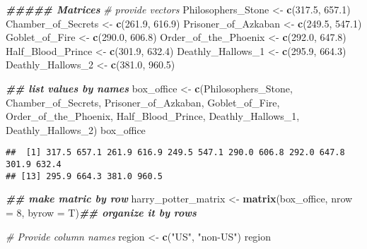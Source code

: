 \documentclass[
]{article}
\newenvironment{Shaded}{\begin{snugshade}}{\end{snugshade}}
\newcommand{\AttributeTok}[1]{\textcolor[rgb]{0.13,0.29,0.53}{#1}}
\newcommand{\CommentTok}[1]{\textcolor[rgb]{0.56,0.35,0.01}{\textit{#1}}}
\newcommand{\DecValTok}[1]{\textcolor[rgb]{0.00,0.00,0.81}{#1}}
\newcommand{\DocumentationTok}[1]{\textcolor[rgb]{0.56,0.35,0.01}{\textbf{\textit{#1}}}}
\newcommand{\FloatTok}[1]{\textcolor[rgb]{0.00,0.00,0.81}{#1}}
\newcommand{\FunctionTok}[1]{\textcolor[rgb]{0.13,0.29,0.53}{\textbf{#1}}}
\newcommand{\NormalTok}[1]{#1}
\newcommand{\OtherTok}[1]{\textcolor[rgb]{0.56,0.35,0.01}{#1}}
\newcommand{\StringTok}[1]{\textcolor[rgb]{0.31,0.60,0.02}{#1}}
\begin{document}
\begin{Shaded}
\begin{Highlighting}[]
\DocumentationTok{\#\#\#\#\# Matrices}
\CommentTok{\# provide vectors}
\NormalTok{Philosophers\_Stone }\OtherTok{\textless{}{-}} \FunctionTok{c}\NormalTok{(}\FloatTok{317.5}\NormalTok{, }\FloatTok{657.1}\NormalTok{)}
\NormalTok{Chamber\_of\_Secrets }\OtherTok{\textless{}{-}} \FunctionTok{c}\NormalTok{(}\FloatTok{261.9}\NormalTok{, }\FloatTok{616.9}\NormalTok{)}
\NormalTok{Prisoner\_of\_Azkaban }\OtherTok{\textless{}{-}} \FunctionTok{c}\NormalTok{(}\FloatTok{249.5}\NormalTok{, }\FloatTok{547.1}\NormalTok{)}
\NormalTok{Goblet\_of\_Fire }\OtherTok{\textless{}{-}} \FunctionTok{c}\NormalTok{(}\FloatTok{290.0}\NormalTok{, }\FloatTok{606.8}\NormalTok{)}
\NormalTok{Order\_of\_the\_Phoenix }\OtherTok{\textless{}{-}} \FunctionTok{c}\NormalTok{(}\FloatTok{292.0}\NormalTok{, }\FloatTok{647.8}\NormalTok{)}
\NormalTok{Half\_Blood\_Prince }\OtherTok{\textless{}{-}} \FunctionTok{c}\NormalTok{(}\FloatTok{301.9}\NormalTok{, }\FloatTok{632.4}\NormalTok{)}
\NormalTok{Deathly\_Hallows\_1 }\OtherTok{\textless{}{-}} \FunctionTok{c}\NormalTok{(}\FloatTok{295.9}\NormalTok{, }\FloatTok{664.3}\NormalTok{)}
\NormalTok{Deathly\_Hallows\_2 }\OtherTok{\textless{}{-}} \FunctionTok{c}\NormalTok{(}\FloatTok{381.0}\NormalTok{, }\FloatTok{960.5}\NormalTok{)}


\DocumentationTok{\#\# list values by names}
\NormalTok{box\_office }\OtherTok{\textless{}{-}} \FunctionTok{c}\NormalTok{(Philosophers\_Stone, Chamber\_of\_Secrets, Prisoner\_of\_Azkaban, Goblet\_of\_Fire, Order\_of\_the\_Phoenix, Half\_Blood\_Prince, Deathly\_Hallows\_1, Deathly\_Hallows\_2)}
\NormalTok{box\_office}
\end{Highlighting}
\end{Shaded}

\begin{verbatim}
##  [1] 317.5 657.1 261.9 616.9 249.5 547.1 290.0 606.8 292.0 647.8 301.9 632.4
## [13] 295.9 664.3 381.0 960.5
\end{verbatim}

\begin{Shaded}
\begin{Highlighting}[]
\DocumentationTok{\#\# make matric by row}
\NormalTok{harry\_potter\_matrix }\OtherTok{\textless{}{-}} \FunctionTok{matrix}\NormalTok{(box\_office, }\AttributeTok{nrow =} \DecValTok{8}\NormalTok{, }\AttributeTok{byrow =}\NormalTok{ T)}\DocumentationTok{\#\# organize it by rows}



\CommentTok{\# Provide column names}
\NormalTok{region }\OtherTok{\textless{}{-}} \FunctionTok{c}\NormalTok{(}\StringTok{"US"}\NormalTok{, }\StringTok{"non{-}US"}\NormalTok{)}
\NormalTok{region}
\end{Highlighting}
\end{Shaded}
\end{document}

